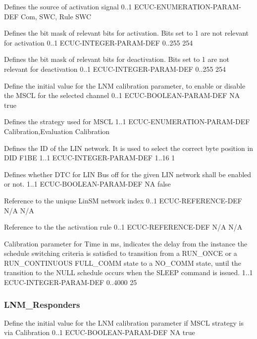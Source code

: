 {Defines the source of activation signal}
{0..1}
{ECUC-ENUMERATION-PARAM-DEF}
{Com, SWC, Rule}
{SWC}


{Defines the bit mask of relevant bits for activation. Bits set to 1 are not relevant for activation}
{0..1}
{ECUC-INTEGER-PARAM-DEF}
{0..255}
{254}


{Defines the bit mask of relevant bits for deactivation. Bits set to 1 are not relevant for deactivation}
{0..1}
{ECUC-INTEGER-PARAM-DEF}
{0..255}
{254}


{Define the initial value for the LNM calibration parameter, to enable or disable the MSCL for the selected channel}
{0..1}
{ECUC-BOOLEAN-PARAM-DEF}
{NA}
{true}


{Defines the strategy used for MSCL}
{1..1}
{ECUC-ENUMERATION-PARAM-DEF}
{Calibration,Evaluation}
{Calibration}


{Defines the ID of the LIN network. It is used to select the correct byte position in DID F1BE}
{1..1}
{ECUC-INTEGER-PARAM-DEF}
{1..16}
{1}


{Defines whether DTC for LIN Bus off for the given LIN network shall be enabled or not.}
{1..1}
{ECUC-BOOLEAN-PARAM-DEF}
{NA}
{false}


{Reference to the unique LinSM network index}
{0..1}
{ECUC-REFERENCE-DEF}
{N/A}
{N/A}


{Reference to the the activation rule}
{0..1}
{ECUC-REFERENCE-DEF}
{N/A}
{N/A}

{Calibration parameter for Time in ms, indicates the delay from the instance the schedule switching criteria is satisfied to transition from a RUN_ONCE or a RUN_CONTINUOUS FULL_COMM state to a NO_COMM state, until the transition to the NULL schedule occurs when the SLEEP command is issued.}
{1..1}
{ECUC-INTEGER-PARAM-DEF}
{0..4000}
{25}

\subsubsection{LNM_Responders}
\label{subsubsec:LNM_Responders}

{Define the initial value for the LNM calibration parameter if MSCL strategy is via Calibration}
{0..1}
{ECUC-BOOLEAN-PARAM-DEF}
{NA}
{true}


